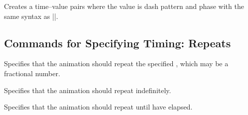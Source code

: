 \begin{command}{\pgfsysanimvaldash{}}
\end{command}
\begin{command}{\pgfsys@animation@val@dash{}}
    Creates a time--value pairs where the value is dash pattern and phase with
    the same syntax as |\pgfsys@setdash|.
\end{command}


\subsection{Commands for Specifying Timing: Repeats}

\begin{command}{}
\end{command}
\begin{command}{\pgfsys@animation@repeat{}}
    Specifies that the animation should repeat the specified , which may be a fractional number.
\begin{codeexample}[imagesource={standalone/pgfmanual-en-pgfsys-animations-animation-26.svg}]
\end{codeexample}
\end{command}

\begin{command}{\pgfsysanimkeyrepeatindefinite}
\end{command}
\begin{command}{\pgfsys@animation@repeat@indefinite}
    Specifies that the animation should repeat indefinitely.
\begin{codeexample}[imagesource={standalone/pgfmanual-en-pgfsys-animations-animation-27.svg}]
\end{codeexample}
\end{command}

\begin{command}{\pgfsysanimkeyrepeatdur{}}
\end{command}
\begin{command}{\pgfsys@animation@repeat@dur{}}
    Specifies that the animation should repeat until  have
    elapsed.
\begin{codeexample}[imagesource={standalone/pgfmanual-en-pgfsys-animations-animation-28.svg}]
\end{codeexample}
\end{command}



